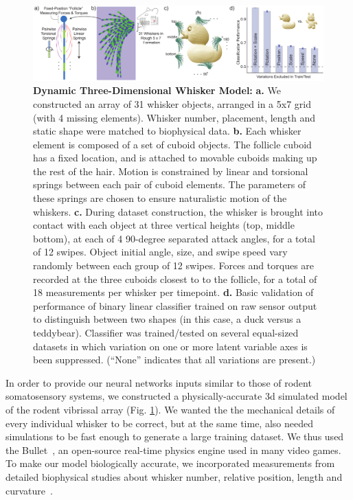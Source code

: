 \begin{figure}
\centering
\includegraphics [width=1\linewidth]{figures/whiskers.pdf}
\vspace{-2mm}
\caption{\textbf{Dynamic Three-Dimensional Whisker Model:} \textbf{a.} We constructed an array of 31 whisker objects, arranged in a 5x7 grid (with 4 missing elements).  
Whisker number, placement, length and static shape were matched to biophysical data. 
\textbf{b.} Each whisker element is composed of a set of cuboid objects.  
The follicle cuboid has a fixed location, and is attached to movable cuboids making up the rest of the hair. 
Motion is constrained by linear and torsional springs between each pair of cuboid elements.  
The parameters of these springs are chosen to ensure naturalistic motion of the whiskers.  
\textbf{c.} During dataset construction, the whisker is brought into contact with each object at three vertical heights (top, middle bottom), at each of 4 90-degree separated attack angles, for a total of 12 swipes.  
Object initial angle, size, and swipe speed vary randomly between each group of 12 swipes.
Forces and torques are recorded at the three cuboids closest to to the follicle, for a total of 18 measurements per whisker per timepoint. 
\textbf{d.} Basic validation of performance of binary linear classifier trained on raw sensor output to distinguish between two shapes (in this case, a duck versus a teddybear).  Classifier was trained/tested on several equal-sized datasets in which variation on one or more latent variable axes is been suppressed. (``None'' indicates that all variations are present.)~\label{fig_whiskers}}
\end{figure}

In order to provide our neural networks inputs similar to those of rodent somatosensory systems, we constructed a physically-accurate 3d simulated model of the rodent vibrissal array (Fig. \ref{fig_whiskers}).  
We wanted the the mechanical details of every individual whisker to be correct, but at the same time, also needed simulations to be fast enough to generate a large training dataset.   
We thus used the Bullet~\cite{wiki:bullet}, an open-source real-time physics engine used in many video games. 
To make our model biologically accurate, we incorporated measurements from detailed biophysical studies about whisker number, relative position, length and curvature~\cite{Towal2011}.

